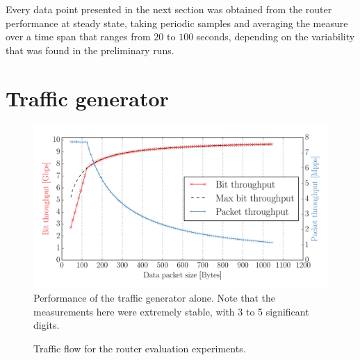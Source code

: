 \documentclass[11pt,a4paper,twoside,titlepage,openany]{book}
\begin{document}
Every data point presented in the next section was obtained from the router performance at steady state, taking periodic samples and averaging the measure over a time span that ranges from $20$ to $100$ seconds, depending on the variability that was found in the preliminary runs.

\section{Traffic generator}\label{sec:test.traffgen}
\begin{figure}[htb]
  \begin{center}
    \includegraphics[width=1.0\textwidth]{img/traffgen_increasing_len.pdf}
    \caption[Performance of the traffic generator alone]{Performance of the traffic generator alone. Note that the measurements here were extremely stable, with 3 to 5 significant digits.}
    \label{fig:test.traffgen-perf}
  \end{center}
\end{figure}
\begin{figure}[htb]
  \begin{center}
    \caption{Traffic flow for the router evaluation experiments.}
    \label{fig:test.flow}
  \end{center}
\end{figure}
\end{document}
